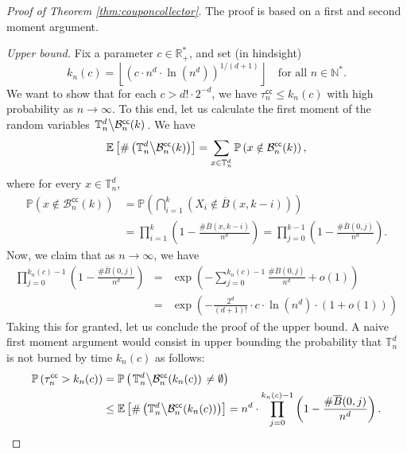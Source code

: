 \documentclass[a4paper,11pt]{article}
\begin{document}
\begin{proof}[Proof of Theorem \ref{thm:couponcollector}]
The proof is based on a first and second moment argument.

\medskip

\emph{Upper bound.}
Fix a parameter $c\in\mathbb{R}_+^*$, and set (in hindsight)
\[k_n(c)=\left\lfloor\left(c\cdot n^d\cdot\ln\left(n^d\right)\right)^{1/(d+1)}\right\rfloor\quad\text{for all $n\in\mathbb{N}^*$.}\]
We want to show that for each $c>d!\cdot2^{-d}$, we have $\tau_n^\mathsf{cc}\leq k_n (c)$ with high probability as $n\to\infty$.
To this end, let us calculate the first moment of the random variables $\left.\mathbb{T}_n^d\middle\backslash\mathcal{B}_n^\mathsf{cc}(k)\right.$.
We have
\[\mathbb{E}\left[\#\left(\mathbb{T}_n^d\middle\backslash\mathcal{B}_n^\mathsf{cc}(k)\right)\right]=\sum_{x\in\mathbb{T}_n^d}\mathbb{P}\left(x\notin\mathcal{B}_n^\mathsf{cc}(k)\right),\]
where for every $x\in\mathbb{T}_n^d$,
\[\begin{split}
\mathbb{P}\left(x\notin\mathcal{B}_n^\mathsf{cc}(k)\right)&=\mathbb{P}\left(\bigcap_{i=1}^k\left(X_i\notin\overline{B}(x,k-i)\right)\right)\\
&=\prod_{i=1}^k\left(1-\frac{\#\overline{B}(x,k-i)}{n^d}\right)=\prod_{j=0}^{k-1}\left(1-\frac{\#\overline{B}(0,j)}{n^d}\right).
\end{split}\]
Now, we claim that as $n\to\infty$, we have
\begin{eqnarray}
\prod_{j=0}^{k_n(c)-1}\left(1-\frac{\#\overline{B}(0,j)}{n^d}\right)&=&\exp\left(-\sum_{j=0}^{k_n(c)-1}\frac{\#\overline{B}(0,j)}{n^d}+o(1)\right)\label{eq:couponcollector1stmoment1}\\
&=&\exp\left(-\frac{2^d}{(d+1)!}\cdot c\cdot\ln\left(n^d\right)\cdot(1+o(1))\right)\label{eq:couponcollector1stmoment2}
\end{eqnarray}
Taking this for granted, let us conclude the proof of the upper bound.
A naive first moment argument would consist in upper bounding the probability that $\mathbb{T}_n^d$ is not burned by time $k_n(c)$ as follows:
\[\begin{split}
\mathbb{P}\left(\tau_n^\mathsf{cc}>k_n(c)\right)&=\mathbb{P}\left(\left.\mathbb{T}_n^d\middle\backslash\mathcal{B}_n^\mathsf{cc}(k_n(c))\right.\neq\emptyset\right)\\
&\leq\mathbb{E}\left[\#\left(\mathbb{T}_n^d\middle\backslash\mathcal{B}_n^\mathsf{cc}(k_n(c))\right)\right]=n^d\cdot\prod_{j=0}^{k_n(c)-1}\left(1-\frac{\#\overline{B}(0,j)}{n^d}\right).
\end{split}\]

\end{proof}
\end{document}
